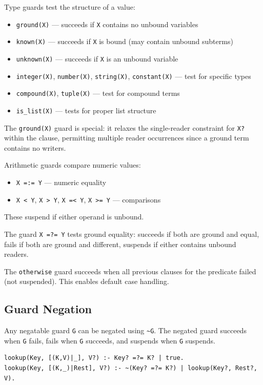 Type guards test the structure of a value:
\begin{itemize}
\item \verb|ground(X)| --- succeeds if \verb|X| contains no unbound variables
\item \verb|known(X)| --- succeeds if \verb|X| is bound (may contain unbound subterms)
\item \verb|unknown(X)| --- succeeds if \verb|X| is an unbound variable
\item \verb|integer(X)|, \verb|number(X)|, \verb|string(X)|, \verb|constant(X)| --- test for specific types
\item \verb|compound(X)|, \verb|tuple(X)| --- test for compound terms
\item \verb|is_list(X)| --- tests for proper list structure
\end{itemize}

The \verb|ground(X)| guard is special: it relaxes the single-reader constraint for \verb|X?| within the clause, permitting multiple reader occurrences since a ground term contains no writers.

Arithmetic guards compare numeric values:
\begin{itemize}
\item \verb|X =:= Y| --- numeric equality
\item \verb|X < Y|, \verb|X > Y|, \verb|X =< Y|, \verb|X >= Y| --- comparisons
\end{itemize}

These suspend if either operand is unbound.

The guard \verb|X =?= Y| tests ground equality: succeeds if both are ground and equal, fails if both are ground and different, suspends if either contains unbound readers.

The \verb|otherwise| guard succeeds when all previous clauses for the predicate failed (not suspended). This enables default case handling.

\subsection{Guard Negation}
\label{sec:guard-negation}

Any negatable guard \verb|G| can be negated using \verb|~G|. The negated guard succeeds when \verb|G| fails, fails when \verb|G| succeeds, and suspends when \verb|G| suspends.

\begin{verbatim}
lookup(Key, [(K,V)|_], V?) :- Key? =?= K? | true.
lookup(Key, [(K,_)|Rest], V?) :- ~(Key? =?= K?) | lookup(Key?, Rest?, V).
\end{verbatim}

